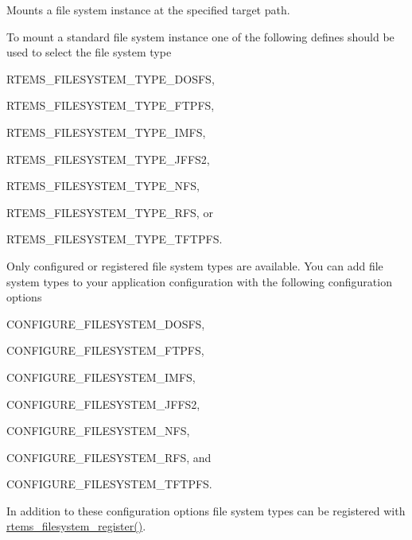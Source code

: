 Mounts a file system instance at the specified target path. 

To mount a standard file system instance one of the following defines should be used to select the file system type
\begin{DoxyItemize}
\item R\+T\+E\+M\+S\+\_\+\+F\+I\+L\+E\+S\+Y\+S\+T\+E\+M\+\_\+\+T\+Y\+P\+E\+\_\+\+D\+O\+S\+FS,
\item R\+T\+E\+M\+S\+\_\+\+F\+I\+L\+E\+S\+Y\+S\+T\+E\+M\+\_\+\+T\+Y\+P\+E\+\_\+\+F\+T\+P\+FS,
\item R\+T\+E\+M\+S\+\_\+\+F\+I\+L\+E\+S\+Y\+S\+T\+E\+M\+\_\+\+T\+Y\+P\+E\+\_\+\+I\+M\+FS,
\item R\+T\+E\+M\+S\+\_\+\+F\+I\+L\+E\+S\+Y\+S\+T\+E\+M\+\_\+\+T\+Y\+P\+E\+\_\+\+J\+F\+F\+S2,
\item R\+T\+E\+M\+S\+\_\+\+F\+I\+L\+E\+S\+Y\+S\+T\+E\+M\+\_\+\+T\+Y\+P\+E\+\_\+\+N\+FS,
\item R\+T\+E\+M\+S\+\_\+\+F\+I\+L\+E\+S\+Y\+S\+T\+E\+M\+\_\+\+T\+Y\+P\+E\+\_\+\+R\+FS, or
\item R\+T\+E\+M\+S\+\_\+\+F\+I\+L\+E\+S\+Y\+S\+T\+E\+M\+\_\+\+T\+Y\+P\+E\+\_\+\+T\+F\+T\+P\+FS.
\end{DoxyItemize}

Only configured or registered file system types are available. You can add file system types to your application configuration with the following configuration options
\begin{DoxyItemize}
\item C\+O\+N\+F\+I\+G\+U\+R\+E\+\_\+\+F\+I\+L\+E\+S\+Y\+S\+T\+E\+M\+\_\+\+D\+O\+S\+FS,
\item C\+O\+N\+F\+I\+G\+U\+R\+E\+\_\+\+F\+I\+L\+E\+S\+Y\+S\+T\+E\+M\+\_\+\+F\+T\+P\+FS,
\item C\+O\+N\+F\+I\+G\+U\+R\+E\+\_\+\+F\+I\+L\+E\+S\+Y\+S\+T\+E\+M\+\_\+\+I\+M\+FS,
\item C\+O\+N\+F\+I\+G\+U\+R\+E\+\_\+\+F\+I\+L\+E\+S\+Y\+S\+T\+E\+M\+\_\+\+J\+F\+F\+S2,
\item C\+O\+N\+F\+I\+G\+U\+R\+E\+\_\+\+F\+I\+L\+E\+S\+Y\+S\+T\+E\+M\+\_\+\+N\+FS,
\item C\+O\+N\+F\+I\+G\+U\+R\+E\+\_\+\+F\+I\+L\+E\+S\+Y\+S\+T\+E\+M\+\_\+\+R\+FS, and
\item C\+O\+N\+F\+I\+G\+U\+R\+E\+\_\+\+F\+I\+L\+E\+S\+Y\+S\+T\+E\+M\+\_\+\+T\+F\+T\+P\+FS.
\end{DoxyItemize}

In addition to these configuration options file system types can be registered with \mbox{\hyperlink{group__FileSystemTypesAndMount_gaac7f1c7fe78f3acc145272809cef62a2}{rtems\+\_\+filesystem\+\_\+register()}}.


